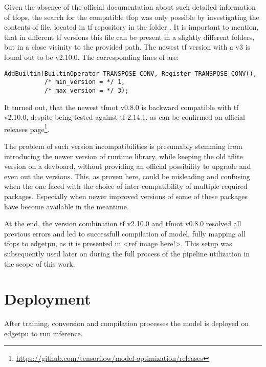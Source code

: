 {Given the absence of the official documentation about such detailed information of \glspl{tfop},
the search for the compatible  \gls{tfop} was only possible by investigating the contents of  file,
located in \gls{tf} repository in the folder . It is important to mention,
that in different \gls{tf} versions this file can be present in a slightly different folders, but in a close vicinity to the provided path.
The newest \gls{tf} version with a  v3 is found out to be v2.10.0. The corresponding lines of  are:

\begin{lstlisting}
AddBuiltin(BuiltinOperator_TRANSPOSE_CONV, Register_TRANSPOSE_CONV(),
           /* min_version = */ 1,
           /* max_version = */ 3);
\end{lstlisting}

It turned out, that the newest \gls{tfmot} v0.8.0 is backward compatible with \gls{tf} v2.10.0, despite being tested against \gls{tf} 2.14.1,
as can be confirmed on official releases page\footnote{\url{https://github.com/tensorflow/model-optimization/releases}}.

The problem of such version incompatibilities is presumably stemming from introducing the newer version of  runtime library,
while keeping the old \gls{tflite} version on a \gls{devboard}, without providing an official possibility to upgrade and even out the versions.
This, as proven here, could be misleading and confusing when the one faced with the choice of inter-compatibility of multiple required packages.
Especially when newer improved versions of some of these packages have become available in the meantime.

At the end, the version combination \gls{tf} v2.10.0 and \gls{tfmot} v0.8.0 resolved all previous errors and led to successfull compilation of model,
fully mapping all \glspl{tfop} to \gls{edgetpu}, as it is presented in <ref image here!>.
This setup was subsequently used later on during the full process of the pipeline utilization in the scope of this work.


\section{Deployment}
\label{sec:deployment}

After training, conversion and compilation processes the  model is deployed on \gls{edgetpu} to run inference.

}
